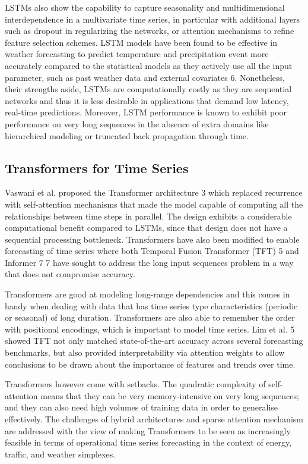 \documentclass[conference]{IEEEtran}
\begin{document}
LSTMs also show the capability to capture seasonality and multidimensional interdependence in a multivariate time series, in particular with additional layers such as dropout in regularizing the networks, or attention mechanisms to refine feature selection schemes. LSTM \cite{hochreiter1997lstm} models have been found to be effective in weather forecasting to predict temperature and precipitation event more accurately compared to the statistical models as they actively use all the input parameter, such as past weather data and external covariates 6. Nonetheless, their strengths aside, LSTMs are computationally costly as they are sequential networks and thus it is less desirable in applications that demand low latency, real-time predictions. Moreover, LSTM \cite{hochreiter1997lstm} performance is known to exhibit poor performance on very long sequences in the absence of extra domains like hierarchical modeling or truncated back propagation through time.

\subsection{Transformers for Time Series}
Vaswani et al. proposed the Transformer \cite{vaswani2017attention} architecture 3 which replaced recurrence with self-attention mechanisms that made the model capable of computing all the relationships between time steps in parallel. The design exhibits a considerable computational benefit compared to LSTMs, since that design does not have a sequential processing bottleneck. Transformers have also been modified to enable forecasting of time series where both Temporal Fusion \cite{lim2021temporal} Transformer \cite{vaswani2017attention} (TFT) 5 and Informer 7 7 have sought to address the long input sequences problem in a way that does not compromise accuracy.

Transformers are good at modeling long-range dependencies and this comes in handy when dealing with data that has time series type characteristics (periodic or seasonal) of long duration. Transformers are also able to remember the order with positional encodings, which is important to model time series. Lim et al. 5 showed TFT not only matched state-of-the-art accuracy across several forecasting benchmarks, but also provided interpretability via attention weights to allow conclusions to be drawn about the importance of features and trends over time.

Transformers however come with setbacks. The quadratic complexity of self-attention means that they can be very memory-intensive on very long sequences; and they can also need high volumes of training data in order to generalise effectively. The challenges of hybrid architectures and sparse attention mechanism are addressed with the view of making Transformers to be seen as increasingly feasible in terms of operational time series forecasting in the context of energy, traffic, and weather simplexes.
\end{document}
